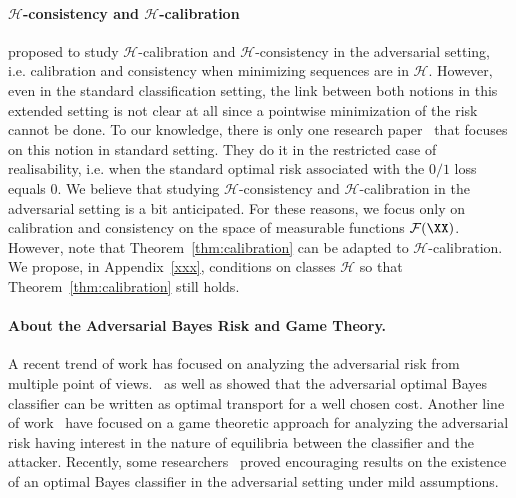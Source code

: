 \paragraph{$\mathcal{H}$-consistency and  $\mathcal{H}$-calibration}
\citet{bao2020calibrated,awasthi2021calibration,awasthi2021finer} proposed to study $\mathcal{H}$-calibration and $\mathcal{H}$-consistency in the adversarial setting, i.e. calibration and consistency when minimizing sequences are in $\mathcal{H}$. However, even in the standard classification setting, the link between both notions in this extended setting is not clear at all since a pointwise minimization of the risk cannot be done. To our knowledge, there is only one research paper~\citep{long2013consistency} that focuses on this notion in standard setting. They do it in the restricted case of realisability, i.e. when the standard optimal risk associated with the $0/1$ loss equals $0$.  We believe that studying  $\mathcal{H}$-consistency and  $\mathcal{H}$-calibration in the adversarial setting is a bit anticipated. For these reasons, we focus only on calibration and consistency on the space of measurable functions $\mathcal{F}(\XX)$. However, note that Theorem~\ref{thm:calibration} can be adapted to $\mathcal{H}$-calibration. We propose, in Appendix~\ref{xxx}, conditions on classes $\mathcal{H}$ so that Theorem~\ref{thm:calibration} still holds.


\paragraph{About the Adversarial Bayes Risk and Game Theory.} A recent trend of work has focused on analyzing the adversarial risk from multiple point of views.~\citet{bhagoji2019lower} as well as \citet{pydi2019adversarial,pydi2021many} showed that the adversarial optimal Bayes classifier can be written as optimal transport for a well chosen cost. Another line of work~\citep{pinot2020randomization,meunier2021mixed,pydi2021many} have focused on a game theoretic approach for analyzing the adversarial risk having interest in the nature of equilibria between the classifier and the attacker. Recently, some researchers~\citep{awasthi2021existence,bungert2021geometry} proved encouraging results on the existence of an optimal Bayes classifier in the adversarial setting under mild assumptions.  


    

